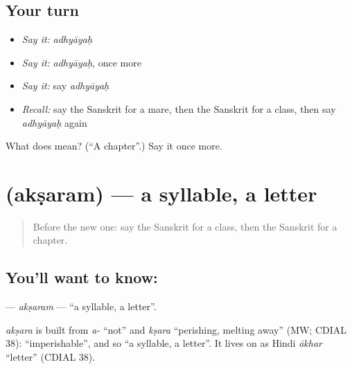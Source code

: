\subsection*{Your turn}
\begin{itemize}
\raggedright
  \item \emph{Say it:} \emph{adhyāyaḥ}
  \item \emph{Say it:} \emph{adhyāyaḥ}, once more
  \item \emph{Say it:} say \emph{adhyāyaḥ}
  \item \emph{Recall:} say the Sanskrit for a mare, then the Sanskrit for a class, then say \emph{adhyāyaḥ} again
\end{itemize}

\begin{tcolorbox}[breakable,colback=teal!4,colframe=teal!35!black,title={Before you move on}]
What does  mean? (\textquotedblleft{}A chapter\textquotedblright{}.) Say it once more.
\end{tcolorbox}
\section[\texorpdfstring{\sk{अक्षरम्} (akṣaram)}{अक्षरम् (akṣaram)}]{ (akṣaram) — a syllable, a letter}

\label{lesson:SA-C168-aksaram}



\begin{quote}
Before the new one: say the Sanskrit for a class, then the Sanskrit for a chapter.
\end{quote}

\subsection*{You'll want to know: }
\textbf{} — \emph{akṣaram} — \textquotedblleft{}a syllable, a letter\textquotedblright{}.

\begin{cousinweb}
\emph{akṣara} is built from \emph{a-} \textquotedblleft{}not\textquotedblright{} and \emph{kṣara} \textquotedblleft{}perishing, melting away\textquotedblright{} (MW; CDIAL 38): \textquotedblleft{}imperishable\textquotedblright{}, and so \textquotedblleft{}a syllable, a letter\textquotedblright{}. It lives on as Hindi \emph{ākhar} \textquotedblleft{}letter\textquotedblright{} (CDIAL 38).
\end{cousinweb}

